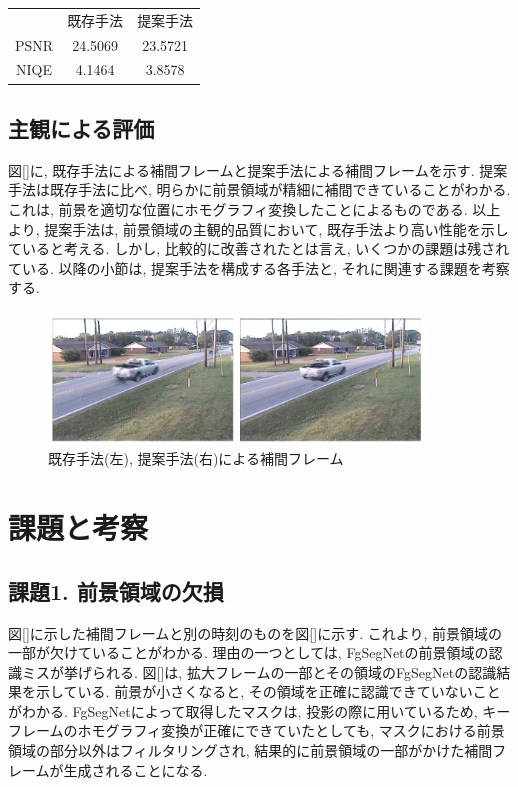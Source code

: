 \documentclass[a4paper,12pt]{jsreport}
\begin{document}
\begin{table}[h]
\begin{tabular}{ccc}
& 既存手法 & 提案手法\\
PSNR & 24.5069 & 23.5721\\
NIQE & 4.1464 & 3.8578
\end{tabular}
\end{table}


\subsection{主観による評価}
図[]に, 既存手法による補間フレームと提案手法による補間フレームを示す.  提案手法は既存手法に比べ, 明らかに前景領域が精細に補間できていることがわかる. これは, 前景を適切な位置にホモグラフィ変換したことによるものである. 以上より, 提案手法は, 前景領域の主観的品質において, 既存手法より高い性能を示していると考える. しかし, 比較的に改善されたとは言え, いくつかの課題は残されている. 以降の小節は, 提案手法を構成する各手法と, それに関連する課題を考察する. 

\begin{figure}[h]
  \begin{center}
    \includegraphics[width=10cm]{./kekka.png}
    \caption{既存手法(左), 提案手法(右)による補間フレーム}
  \end{center}
\end{figure}

\section{課題と考察}

\subsection{課題1. 前景領域の欠損}
図[]に示した補間フレームと別の時刻のものを図[]に示す. これより, 前景領域の一部が欠けていることがわかる. 理由の一つとしては, FgSegNetの前景領域の認識ミスが挙げられる. 図[]は, 拡大フレームの一部とその領域のFgSegNetの認識結果を示している. 前景が小さくなると, その領域を正確に認識できていないことがわかる. FgSegNetによって取得したマスクは, 投影の際に用いているため, キーフレームのホモグラフィ変換が正確にできていたとしても, マスクにおける前景領域の部分以外はフィルタリングされ, 結果的に前景領域の一部がかけた補間フレームが生成されることになる. 
\end{document}
